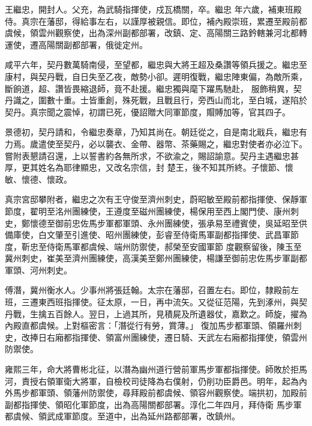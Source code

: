 
\begin{pinyinscope}

 王繼忠，開封人。父充，為武騎指揮使，戍瓦橋關，卒。繼忠
 年六歲，補東班殿侍。真宗在藩邸，得給事左右，以謹厚被親信。即位，補內殿崇班，累遷至殿前都虞候，領雲州觀察使，出為深州副都部署，改鎮、定、高陽關三路鈐轄兼河北都轉運使，遷高陽關副都部署，俄徙定州。



 咸平六年，契丹數萬騎南侵，至望都，繼忠與大將王超及桑讚等領兵援之。繼忠至康村，與契丹戰，自日失至乙夜，敵勢小卻。遲明復戰，繼忠陣東偏，為敵所乘，斷餉道，超、讚皆畏縮退師，竟不赴援。繼忠獨與麾下躍馬馳赴，
 服飾稍異，契丹識之，圍數十重。士皆重創，殊死戰，且戰且行，旁西山而北，至白城，遂陷於契丹。真宗聞之震悼，初謂已死，優詔贈大同軍節度，賵賻加等，官其四子。



 景德初，契丹請和，令繼忠奏章，乃知其尚在。朝廷從之，自是南北戢兵，繼忠有力焉。歲遣使至契丹，必以襲衣、金帶、器幣、茶藥賜之，繼忠對使者亦必泣下。嘗附表懇請召還，上以誓書約各無所求，不欲渝之，賜詔諭意。契丹主遇繼忠甚厚，更其姓名為耶律顯忠，又改名宗信，封
 楚王，後不知其所終。子懷節、懷敏、懷德、懷政。



 真宗宮邸攀附者，繼忠之次有王守俊至濟州刺史，蔚昭敏至殿前都指揮使、保靜軍節度，翟明至洺州團練使，王遵度至磁州團練使，楊保用至西上閣門使、康州刺史，鄭懷德至御前忠佐馬步軍都軍頭、永州團練使，張承易至禮賓使，吳延昭至供備庫使，白文肇至引進使、昭州團練使，彭睿至侍衛馬軍副都指揮使、武昌軍節度，靳忠至侍衛馬軍都虞候、端州防禦使，郝榮至安國軍節
 度觀察留後，陳玉至冀州刺史，崔美至濟州團練使，高漢美至鄭州團練使，楊謙至御前忠佐馬步軍副都軍頭、河州刺史。



 傅潛，冀州衡水人。少事州將張廷翰。太宗在藩邸，召置左右。即位，隸殿前左班，三遷東西班指揮使。征太原，一日，再中流矢。又從征范陽，先到涿州，與契丹戰，生擒五百餘人。翌日，上過其所，見積屍及所遺器仗，嘉歎之。師旋，擢為內殿直都虞候。上對樞密言：「潛從行有勞，賞薄。」
 復加馬步都軍頭、領羅州刺史，改捧日右廂都指揮使、領富州團練使，遷日騎、天武左右廂都指揮使，領雲州防禦使。



 雍熙三年，命大將曹彬北征，以潛為幽州道行營前軍馬步軍都指揮使。師敗於拒馬河，責授右領軍衛大將軍，自檢校司徒降為右僕射，仍削功臣爵邑。明年，起為內外馬步都軍頭、領藩州防禦使，尋拜殿前都虞候、領容州觀察使。端拱初，加殿前副都指揮使、領昭化軍節度，出為高陽關都部署。淳化二年四月，拜侍衛
 馬步軍都虞候、領武成軍節度。至道中，出為延州路都部署，改鎮州。




\end{pinyinscope}
